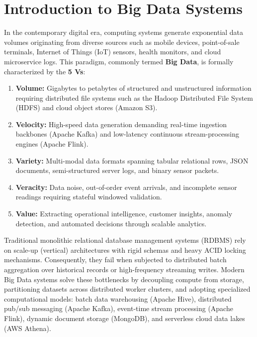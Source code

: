 \documentclass[12pt,a4paper]{report}
\begin{document}
\section{Introduction to Big Data Systems}
In the contemporary digital era, computing systems generate exponential data volumes originating from diverse sources such as mobile devices, point-of-sale terminals, Internet of Things (IoT) sensors, health monitors, and cloud microservice logs. This paradigm, commonly termed \textbf{Big Data}, is formally characterized by the \textbf{5 Vs}:
\begin{enumerate}
    \item \textbf{Volume:} Gigabytes to petabytes of structured and unstructured information requiring distributed file systems such as the Hadoop Distributed File System (HDFS) and cloud object stores (Amazon S3).
    \item \textbf{Velocity:} High-speed data generation demanding real-time ingestion backbones (Apache Kafka) and low-latency continuous stream-processing engines (Apache Flink).
    \item \textbf{Variety:} Multi-modal data formats spanning tabular relational rows, JSON documents, semi-structured server logs, and binary sensor packets.
    \item \textbf{Veracity:} Data noise, out-of-order event arrivals, and incomplete sensor readings requiring stateful windowed validation.
    \item \textbf{Value:} Extracting operational intelligence, customer insights, anomaly detection, and automated decisions through scalable analytics.
\end{enumerate}

Traditional monolithic relational database management systems (RDBMS) rely on scale-up (vertical) architectures with rigid schemas and heavy ACID locking mechanisms. Consequently, they fail when subjected to distributed batch aggregation over historical records or high-frequency streaming writes. Modern Big Data systems solve these bottlenecks by decoupling compute from storage, partitioning datasets across distributed worker clusters, and adopting specialized computational models: batch data warehousing (Apache Hive), distributed pub/sub messaging (Apache Kafka), event-time stream processing (Apache Flink), dynamic document storage (MongoDB), and serverless cloud data lakes (AWS Athena).
\end{document}
